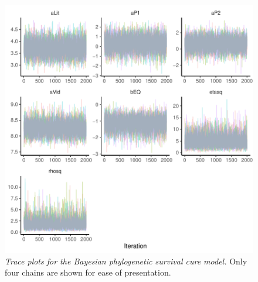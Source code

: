 \documentclass[
  man, donotrepeattitle,floatsintext]{apa6}
\begin{document}
\newpage



\begin{figure}
\centering
\includegraphics{manuscript_files/figure-latex/plotTrace-1.pdf}
\caption{\label{fig:plotTrace}\emph{Trace plots for the Bayesian phylogenetic survival cure model.} Only four chains are shown for ease of presentation.}
\end{figure}

\newpage
\end{document}
